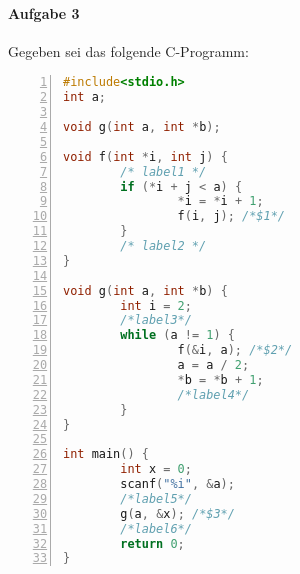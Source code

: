 \documentclass{scrreprt}
\begin{document}
\newpage
\paragraph{Aufgabe 3}
Gegeben sei das folgende C-Programm:
\begin{lstlisting}[language=C, numbers=left, showstringspaces=false]
#include<stdio.h>
int a;

void g(int a, int *b);

void f(int *i, int j) {
        /* label1 */
        if (*i + j < a) {
                *i = *i + 1;
                f(i, j); /*$1*/
        }
        /* label2 */
}

void g(int a, int *b) {
        int i = 2;
        /*label3*/
        while (a != 1) {
                f(&i, a); /*$2*/
                a = a / 2;
                *b = *b + 1;
                /*label4*/
        }
}

int main() {
        int x = 0;
        scanf("%i", &a);
        /*label5*/
        g(a, &x); /*$3*/
        /*label6*/
        return 0;
}
\end{lstlisting}
\newpage
\end{document}
